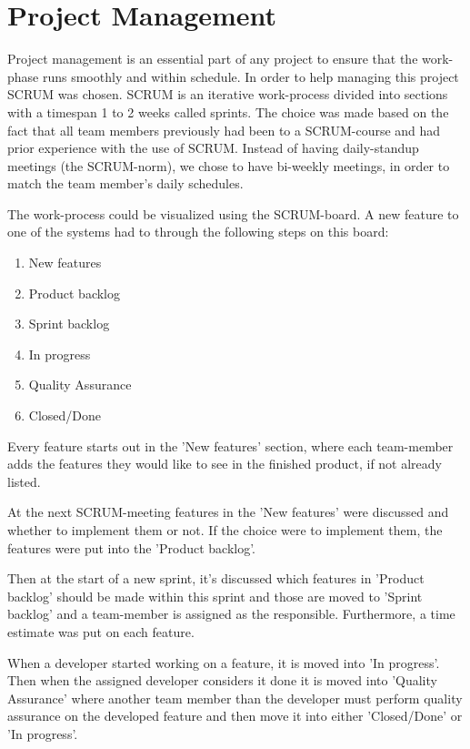 \chapter{Project Management}
Project management is an essential part of any project to ensure that the work-phase runs smoothly and within schedule. In order to help managing this project SCRUM was chosen. SCRUM is an iterative work-process divided into sections with a timespan 1 to 2 weeks called sprints.
The choice was made based on the fact that all team members previously had been to a SCRUM-course and had prior experience with the use of SCRUM. Instead of having daily-standup meetings (the SCRUM-norm), we chose to have bi-weekly meetings, in order to match the team member's daily schedules.

The work-process could be visualized using the SCRUM-board. A new feature to one of the systems had to through the following steps on this board:
\begin{enumerate}
	\item New features
	\item Product backlog
	\item Sprint backlog
	\item In progress
	\item Quality Assurance
	\item Closed/Done
\end{enumerate}

Every feature starts out in the 'New features' section, where each team-member adds the features they would like to see in the finished product, if not already listed.

At the next SCRUM-meeting features in the 'New features' were discussed and whether to implement them or not. If the choice were to implement them, the features were put into the 'Product backlog'.

Then at the start of a new sprint, it's discussed which features in 'Product backlog' should be made within this sprint and those are moved to 'Sprint backlog' and a team-member is assigned as the responsible. Furthermore, a time estimate was put on each feature.

When a developer started working on a feature, it is moved into 'In progress'. Then when the assigned developer considers it done it is moved into 'Quality Assurance' where another team member than the developer must perform quality assurance on the developed feature and then move it into either 'Closed/Done' or 'In progress'.

